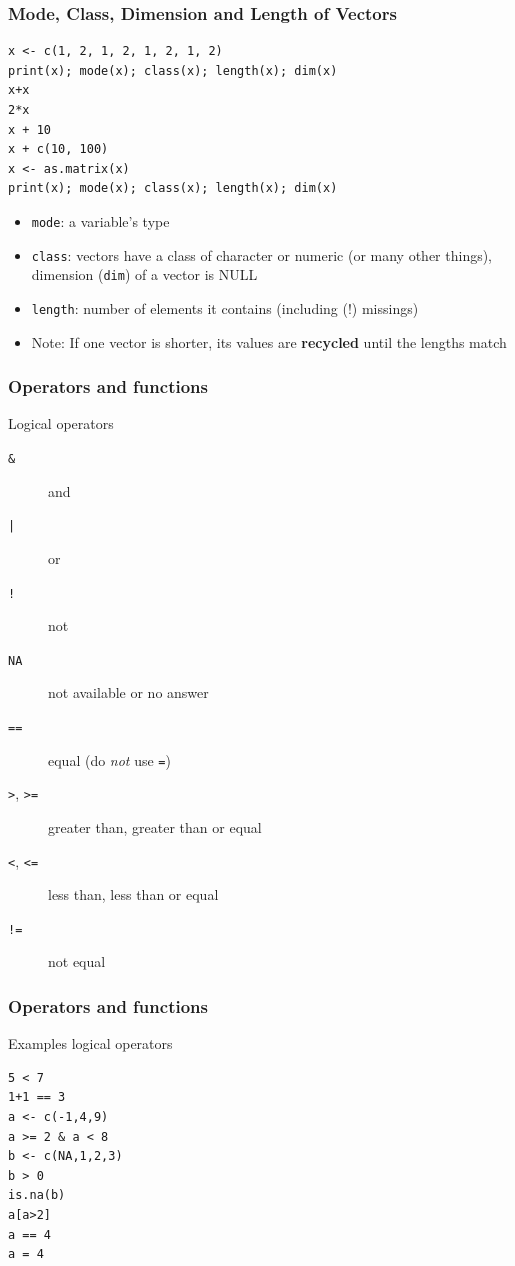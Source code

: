 \documentclass[xcolor={svgnames},10pt,
handout
]{beamer}
\begin{document}
\begin{frame}[fragile]\frametitle{Mode, Class, Dimension and Length of Vectors}
\begin{lstlisting}
x <- c(1, 2, 1, 2, 1, 2, 1, 2)
print(x); mode(x); class(x); length(x); dim(x)
x+x
2*x
x + 10
x + c(10, 100)
x <- as.matrix(x)
print(x); mode(x); class(x); length(x); dim(x)
\end{lstlisting}\pause
\footnotesize
\begin{itemize}
	\item \lstinline|mode|: a variable's type
	\item \lstinline|class|: vectors have a class of character or numeric (or many other things), dimension (\lstinline|dim|) of a vector is NULL
	\item \lstinline|length|: number of elements it contains (including (!) missings)
	\item Note: If one vector is shorter, its values are \textbf{recycled} until the lengths match
\end{itemize}
\end{frame}

\begin{frame}\frametitle{Operators and functions}
Logical operators
\begin{description}
\item[\texttt{\&}] and
\item[\texttt{|}] or
\item[\texttt{!}] not
\item[\texttt{NA}] not available or no answer
\item[\texttt{==}] equal (do \emph{not} use \texttt{=})
\item[\texttt{>}, \texttt{>=}] greater than,
greater than or equal
\item[\texttt{<}, \texttt{<=}] less than, less
than or equal
\item[\texttt{!=}] not equal
\end{description}
\end{frame}


\begin{frame}[fragile]
\frametitle{Operators and functions}
Examples logical operators
\begin{lstlisting}
5 < 7
1+1 == 3
a <- c(-1,4,9)
a >= 2 & a < 8
b <- c(NA,1,2,3)
b > 0
is.na(b)
a[a>2]
a == 4
a = 4
\end{lstlisting}

\end{frame}
\end{document}

